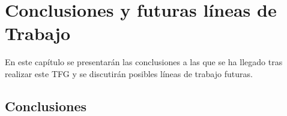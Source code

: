 %
%
%

\chapter{Conclusiones y futuras líneas de Trabajo} \label{chap:Conclusiones} 

En este capítulo se presentarán las conclusiones a las que se ha llegado tras realizar este TFG y se discutirán posibles líneas de trabajo futuras.

\section{Conclusiones}
 